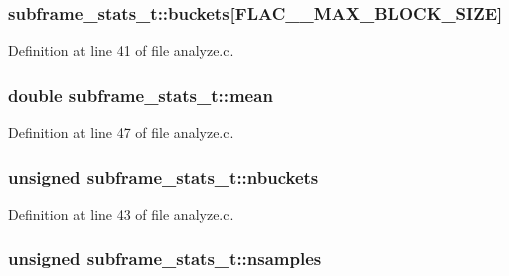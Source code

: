 \subsubsection[{\texorpdfstring{buckets}{buckets}}]{ subframe\+\_\+stats\+\_\+t\+::buckets\mbox{[}{\bf F\+L\+A\+C\+\_\+\+\_\+\+M\+A\+X\+\_\+\+B\+L\+O\+C\+K\+\_\+\+S\+I\+ZE}\mbox{]}}\hypertarget{structsubframe__stats__t_a584be702a747fc71ec30d3f8e3a74d27}{}\label{structsubframe__stats__t_a584be702a747fc71ec30d3f8e3a74d27}


Definition at line 41 of file analyze.\+c.

\subsubsection[{\texorpdfstring{mean}{mean}}]{\setlength{\rightskip}{0pt plus 5cm}double subframe\+\_\+stats\+\_\+t\+::mean}\hypertarget{structsubframe__stats__t_aec416770c6946c649c9b1d6805a00bfb}{}\label{structsubframe__stats__t_aec416770c6946c649c9b1d6805a00bfb}


Definition at line 47 of file analyze.\+c.

\subsubsection[{\texorpdfstring{nbuckets}{nbuckets}}]{\setlength{\rightskip}{0pt plus 5cm}unsigned subframe\+\_\+stats\+\_\+t\+::nbuckets}\hypertarget{structsubframe__stats__t_a4776cf2c62aaf31fa6b11a9b92f713eb}{}\label{structsubframe__stats__t_a4776cf2c62aaf31fa6b11a9b92f713eb}


Definition at line 43 of file analyze.\+c.

\subsubsection[{\texorpdfstring{nsamples}{nsamples}}]{\setlength{\rightskip}{0pt plus 5cm}unsigned subframe\+\_\+stats\+\_\+t\+::nsamples}\hypertarget{structsubframe__stats__t_a09a6de07b7d56145bee2bad134c163b1}{}\label{structsubframe__stats__t_a09a6de07b7d56145bee2bad134c163b1}


